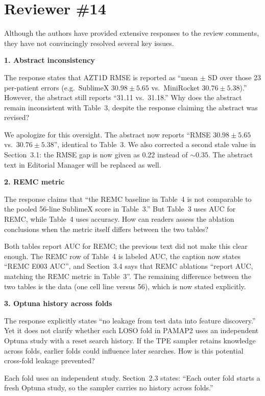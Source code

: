 \documentclass[11pt]{article}
\makeatletter
\newcommand{\rsp}{\par\vspace{0.9em}}
\newcommand{\rc}[1]{\begin{reviewerbox}#1\end{reviewerbox}}
\newcommand{\rcitem}[2]{\begin{reviewerbox}\textbf{#1}\par\smallskip#2\end{reviewerbox}}
\newcommand{\response}[2]{%
  \begin{responsebox}#1%
  \def\@responseitems{#2}%
  \ifx\@responseitems\empty\else\begin{itemize}[nosep,leftmargin=1.2em]#2\end{itemize}\fi
  \end{responsebox}\rsp}
\makeatother
\begin{document}
\section*{Reviewer \#14}

\rc{Although the authors have provided extensive responses to the review comments, they have not
convincingly resolved several key issues.}

\rcitem{1. Abstract inconsistency}{The response states that AZT1D RMSE is reported as ``mean $\pm$ SD
over those 23 per-patient errors (e.g.\ SublimeX $30.98\pm5.65$ vs.\ MiniRocket $30.76\pm5.38$).''
However, the abstract still reports ``31.11 vs.\ 31.18.'' Why does the abstract remain inconsistent
with Table~3, despite the response claiming the abstract was revised?}

\response{We apologize for this oversight. The abstract now reports ``RMSE $30.98\pm5.65$ vs.\
$30.76\pm5.38$'', identical to Table~3. We also corrected a second stale value in Section~3.1: the
RMSE gap is now given as $0.22$ instead of ${\sim}0.35$. The abstract text in Editorial Manager will be
replaced as well.}{}

\rcitem{2. REMC metric}{The response claims that ``the REMC baseline in Table~4 is not comparable to
the pooled 56-line SublimeX score in Table~3.'' But Table~3 uses AUC for REMC, while Table~4 uses
accuracy. How can readers assess the ablation conclusions when the metric itself differs between the
two tables?}

\response{Both tables report AUC for REMC; the previous text did not make this clear enough. The
REMC row of Table~4 is labeled AUC, the caption now states ``REMC E003 AUC'', and Section~3.4 says
that REMC ablations ``report AUC, matching the REMC metric in Table~3''. The remaining difference
between the two tables is the data (one cell line versus 56), which is now stated explicitly.}{}

\rcitem{3. Optuna history across folds}{The response explicitly states ``no leakage from test data
into feature discovery.'' Yet it does not clarify whether each LOSO fold in PAMAP2 uses an independent
Optuna study with a reset search history. If the TPE sampler retains knowledge across folds, earlier
folds could influence later searches. How is this potential cross-fold leakage prevented?}

\response{Each fold uses an independent study. Section~2.3 states: ``Each outer fold starts a fresh
Optuna study, so the sampler carries no history across folds.''}{}
\end{document}
